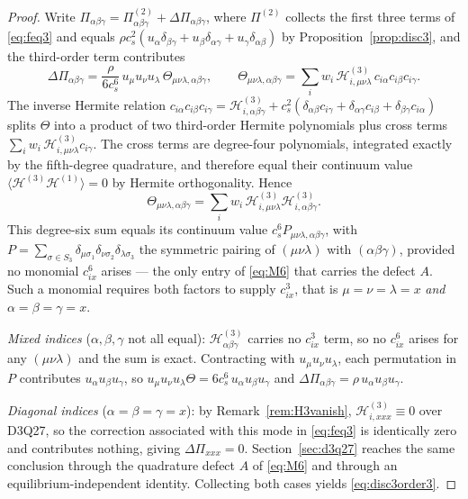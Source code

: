 \documentclass[preprint,11pt]{elsarticle}
\newcommand{\cs}{c_s}
\newcommand{\sumi}{\sum_i}
\begin{document}
\begin{proof}
Write $\Pi_{\alpha\beta\gamma}=\Pi^{(2)}_{\alpha\beta\gamma}
+\Delta\Pi_{\alpha\beta\gamma}$, where $\Pi^{(2)}$ collects the first three terms
of \eqref{eq:feq3} and equals
$\rho\cs^{2}(u_\alpha\delta_{\beta\gamma}+u_\beta\delta_{\alpha\gamma}
+u_\gamma\delta_{\alpha\beta})$ by Proposition~\ref{prop:disc3}, and the
third-order term contributes
\begin{equation*}
\Delta\Pi_{\alpha\beta\gamma}
=\frac{\rho}{6\cs^{6}}\,u_\mu u_\nu u_\lambda\,
\Theta_{\mu\nu\lambda,\alpha\beta\gamma},
\qquad
\Theta_{\mu\nu\lambda,\alpha\beta\gamma}
=\sumi w_i\,\mathcal{H}^{(3)}_{i,\mu\nu\lambda}\,
c_{i\alpha}c_{i\beta}c_{i\gamma}.
\end{equation*}
The inverse Hermite relation $c_{i\alpha}c_{i\beta}c_{i\gamma}
=\mathcal{H}^{(3)}_{i,\alpha\beta\gamma}
+\cs^{2}(\delta_{\alpha\beta}c_{i\gamma}+\delta_{\alpha\gamma}c_{i\beta}
+\delta_{\beta\gamma}c_{i\alpha})$ splits $\Theta$ into a product of two
third-order Hermite polynomials plus cross terms
$\sumi w_i\,\mathcal{H}^{(3)}_{i,\mu\nu\lambda}c_{i\gamma}$. The cross terms are
degree-four polynomials, integrated exactly by the fifth-degree quadrature, and
therefore equal their continuum value
$\langle\mathcal{H}^{(3)}\mathcal{H}^{(1)}\rangle=0$ by Hermite orthogonality.
Hence
\begin{equation*}
\Theta_{\mu\nu\lambda,\alpha\beta\gamma}
=\sumi w_i\,\mathcal{H}^{(3)}_{i,\mu\nu\lambda}
\mathcal{H}^{(3)}_{i,\alpha\beta\gamma}.
\end{equation*}
This degree-six sum equals its continuum value
$\cs^{6}P_{\mu\nu\lambda,\alpha\beta\gamma}$, with
$P=\sum_{\sigma\in S_3}\delta_{\mu\sigma_1}\delta_{\nu\sigma_2}
\delta_{\lambda\sigma_3}$ the symmetric pairing of $(\mu\nu\lambda)$ with
$(\alpha\beta\gamma)$, provided no monomial $c_{ix}^{6}$ arises --- the only
entry of \eqref{eq:M6} that carries the defect $A$. Such a monomial requires
both factors to supply $c_{ix}^{3}$, that is $\mu=\nu=\lambda=x$ \emph{and}
$\alpha=\beta=\gamma=x$.

\emph{Mixed indices} ($\alpha,\beta,\gamma$ not all equal):
$\mathcal{H}^{(3)}_{\alpha\beta\gamma}$ carries no $c_{ix}^{3}$ term, so no
$c_{ix}^{6}$ arises for any $(\mu\nu\lambda)$ and the sum is exact. Contracting
with $u_\mu u_\nu u_\lambda$, each permutation in $P$ contributes
$u_\alpha u_\beta u_\gamma$, so
$u_\mu u_\nu u_\lambda\Theta=6\cs^{6}\,u_\alpha u_\beta u_\gamma$ and
$\Delta\Pi_{\alpha\beta\gamma}=\rho\,u_\alpha u_\beta u_\gamma$.

\emph{Diagonal indices} ($\alpha=\beta=\gamma=x$): by
Remark~\ref{rem:H3vanish}, $\mathcal{H}^{(3)}_{i,xxx}\equiv0$ over D3Q27, so the
correction associated with this mode in \eqref{eq:feq3} is identically zero and
contributes nothing, giving $\Delta\Pi_{xxx}=0$.
Section~\ref{sec:d3q27} reaches the same conclusion through the quadrature defect
$A$ of \eqref{eq:M6} and through an equilibrium-independent identity. Collecting
both cases yields \eqref{eq:disc3order3}.
\end{proof}
\end{document}

